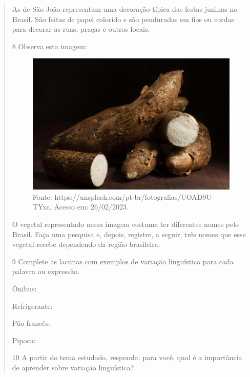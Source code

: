 \begin{quote}
As \preencher\preencher\preencher de São João representam uma decoração típica das
festas juninas no Brasil. São feitas de papel colorido e são penduradas
em fios ou cordas para decorar as ruas, praças e outros locais.



\num{8} Observa esta imagem:

\begin{figure}[htpb!]
\includegraphics[width=.5\textwidth]{./imgs/img19b.jpg}
\caption{Fonte: https://unsplash.com/pt-br/fotografias/UOAD9U-TYxc. Acesso em: 26/02/2023.}
\end{figure}

O vegetal representado nessa imagem costuma ter diferentes nomes pelo Brasil.
Faça uma pesquisa e, depois, registre, a seguir, três nomes que esse vegetal recebe dependendo da região brasileira.



\num{9} Complete as lacunas com exemplos de variação linguística para cada palavra ou expressão.

\begin{escolha}
\item Ônibus: 

\item Refrigerante: 

\item Pão francês:

\item Pipoca: 
\end{escolha}


\num{10} A partir do tema estudado, responda: para você, qual é a importância de
aprender sobre variação linguística?



\end{quote}
